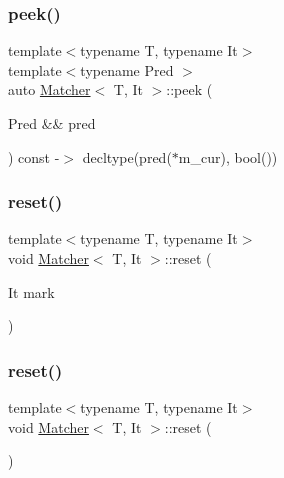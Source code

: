 \mbox{\label{class_matcher_a4c92e3958c64eee29812f4ed75c331cf}} 
\subsubsection{\texorpdfstring{peek()}{peek()}\hspace{0.1cm}{\footnotesize\ttfamily [2/2]}}
{\footnotesize\ttfamily template$<$typename T, typename It$>$ \\
template$<$typename Pred $>$ \\
auto \hyperlink{class_matcher}{Matcher}$<$ T, It $>$\+::peek (\begin{DoxyParamCaption}\item[{Pred \&\&}]{pred }\end{DoxyParamCaption}) const -\/$>$ decltype(pred($\ast$m\+\_\+cur), bool())
  \hspace{0.3cm}{\ttfamily [inline]}}

\mbox{\label{class_matcher_abb67aa2acac25b34d80ffb2e64eef44c}} 
\subsubsection{\texorpdfstring{reset()}{reset()}\hspace{0.1cm}{\footnotesize\ttfamily [1/2]}}
{\footnotesize\ttfamily template$<$typename T, typename It$>$ \\
void \hyperlink{class_matcher}{Matcher}$<$ T, It $>$\+::reset (\begin{DoxyParamCaption}\item[{It}]{mark }\end{DoxyParamCaption})\hspace{0.3cm}{\ttfamily [inline]}}

\mbox{\label{class_matcher_a18de8d97996c28deb6ac787f2a0981a6}} 
\subsubsection{\texorpdfstring{reset()}{reset()}\hspace{0.1cm}{\footnotesize\ttfamily [2/2]}}
{\footnotesize\ttfamily template$<$typename T, typename It$>$ \\
void \hyperlink{class_matcher}{Matcher}$<$ T, It $>$\+::reset (\begin{DoxyParamCaption}{ }\end{DoxyParamCaption})\hspace{0.3cm}{\ttfamily [inline]}}

